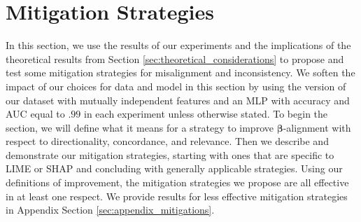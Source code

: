 \documentclass[mnsc,blindrev]{informs3}
\begin{document}
          
         



\section{Mitigation Strategies}
    \label{sec:mitigation_strategies}
    In this section, we use the results of our experiments and the implications of the theoretical results from Section \ref{sec:theoretical_considerations} to propose and test some mitigation strategies for misalignment and inconsistency. We soften the impact of our choices for data and model in this section by using the version of our dataset with mutually independent features and an MLP with accuracy and AUC equal to $.99$ in each experiment unless otherwise stated. To begin the section, we will define what it means for a strategy to improve $\boldsymbol{\beta}$-alignment with respect to directionality, concordance, and relevance. Then we describe and demonstrate our mitigation strategies, starting with ones that are specific to LIME or SHAP and concluding with generally applicable strategies. Using our definitions of improvement, the mitigation strategies we propose are all effective in at least one respect. We provide results for less effective mitigation strategies in Appendix Section \ref{sec:appendix_mitigations}. 
\end{document}
